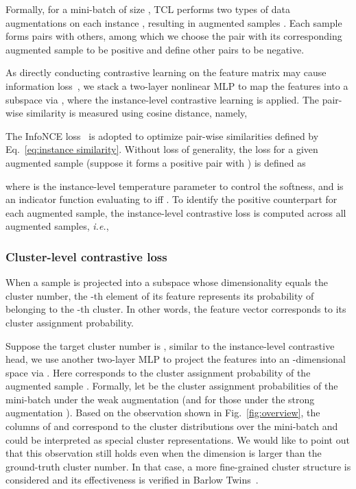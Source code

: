 Formally, for a mini-batch of size , TCL performs two types of data augmentations on each instance , resulting in  augmented samples  . Each sample  forms  pairs with others, among which we choose the pair with its corresponding augmented sample  to be positive and define other  pairs to be negative.

As directly conducting contrastive learning on the feature matrix may cause information loss~\citep{SimCLR}, we stack a two-layer nonlinear MLP  to map the features into a subspace via , where the instance-level contrastive learning is applied. The pair-wise similarity is measured using cosine distance, namely,


The InfoNCE loss~\citep{CPC} is adopted to optimize pair-wise similarities defined by Eq.~\ref{eq:instance similarity}. Without loss of generality, the loss for a given augmented sample  (suppose it forms a positive pair with ) is defined as

where  is the instance-level temperature parameter to control the softness, and  is an indicator function evaluating to  iff . To identify the positive counterpart for each augmented sample, the instance-level contrastive loss is computed across all augmented samples, \textit{i.e.},


\subsubsection{Cluster-level contrastive loss}

When a sample is projected into a subspace whose dimensionality equals the cluster number, the -th element of its feature represents its probability of belonging to the -th cluster. In other words, the feature vector corresponds to its cluster assignment probability.

Suppose the target cluster number is , similar to the instance-level contrastive head, we use another two-layer MLP  to project the features into an -dimensional space via . Here  corresponds to the cluster assignment probability of the augmented sample . Formally, let  be the cluster assignment probabilities of the mini-batch under the weak augmentation  (and  for those under the strong augmentation ). Based on the observation shown in Fig.~\ref{fig:overview}, the columns of  and  correspond to the cluster distributions over the mini-batch and could be interpreted as special cluster representations. We would like to point out that this observation still holds even when the dimension is larger than the ground-truth cluster number. In that case, a more fine-grained cluster structure is considered and its effectiveness is verified in Barlow Twins~\citep{BarlowTwins}.

